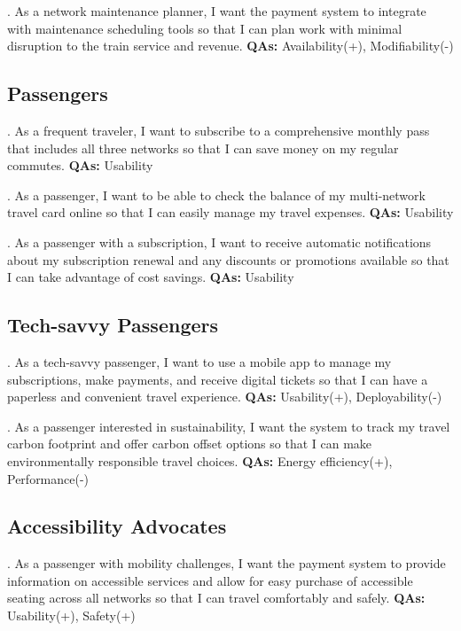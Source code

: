 . As a network maintenance planner, I want the payment system to integrate with maintenance scheduling tools so that I can plan work with minimal disruption to the train service and revenue. \textbf{QAs:} Availability(+), Modifiability(-)


\subsection{Passengers}

. As a frequent traveler, I want to subscribe to a comprehensive monthly pass that includes all three networks so that I can save money on my regular commutes. \textbf{QAs:} Usability

. As a passenger, I want to be able to check the balance of my multi-network travel card online so that I can easily manage my travel expenses. \textbf{QAs:} Usability

. As a passenger with a subscription, I want to receive automatic notifications about my subscription renewal and any discounts or promotions available so that I can take advantage of cost savings. \textbf{QAs:} Usability

\subsection{Tech-savvy Passengers}

. As a tech-savvy passenger, I want to use a mobile app to manage my subscriptions, make payments, and receive digital tickets so that I can have a paperless and convenient travel experience. \textbf{QAs:} Usability(+), Deployability(-)

. As a passenger interested in sustainability, I want the system to track my travel carbon footprint and offer carbon offset options so that I can make environmentally responsible travel choices. \textbf{QAs:} Energy efficiency(+), Performance(-)

\subsection{Accessibility Advocates}

. As a passenger with mobility challenges, I want the payment system to provide information on accessible services and allow for easy purchase of accessible seating across all networks so that I can travel comfortably and safely. \textbf{QAs:} Usability(+), Safety(+)


